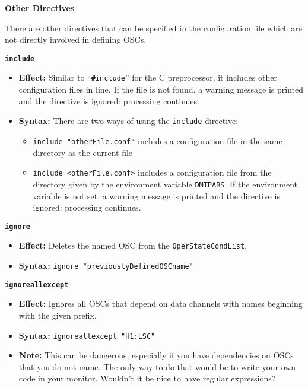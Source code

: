 {\begin{center}
  \textbf{{\large Other Directives}}
\end{center}

There are other directives that can be specified in the configuration
file which are not directly involved in defining OSCs.

{\large\texttt{\textbf{include}}}
\begin{itemize}
\item \textbf{Effect:} Similar to ``\texttt{\#include}'' for the C
  preprocessor, it includes other configuration files in line. If the
  file is not found, a warning message is printed and the directive is
  ignored:  processing continues.
\item \textbf{Syntax:} There are two ways of using the
  \texttt{include} directive:
  \begin{itemize}
  \item \texttt{include "otherFile.conf"} includes a configuration
    file in the same directory as the current file
  \item \texttt{include <otherFile.conf>} includes a configuration
    file from the directory given by the environment variable
    \texttt{DMTPARS}.  If the environment variable is not set, 
    a warning message is printed and the directive is ignored:
    processing continues.
  \end{itemize}
\end{itemize}

{\large\texttt{\textbf{ignore}}}
\begin{itemize}
\item \textbf{Effect:} Deletes the named OSC from the
  \texttt{OperStateCondList}.
\item \textbf{Syntax:} \texttt{ignore "previouslyDefinedOSCname"}
\end{itemize}

{\large\texttt{\textbf{ignoreallexcept}}}
\begin{itemize}
\item \textbf{Effect:} Ignores all OSCs that depend on data channels
  with names beginning with the given prefix.
\item \textbf{Syntax:} \texttt{ignoreallexcept "H1:LSC"}
\item \textbf{Note:} This can be dangerous, especially if you have
  dependencies on OSCs that you do not name.  The only way to do that 
  would be to write your own code in your monitor.  Wouldn't it be
  nice to have regular expressions? 
\end{itemize}

}
